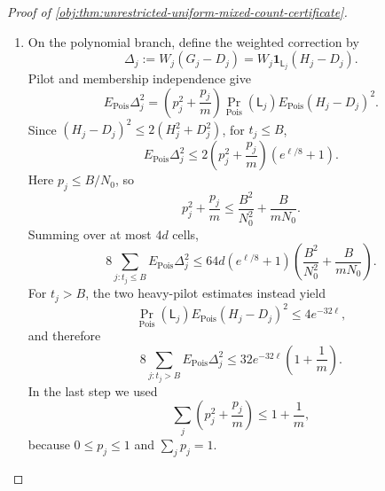 \documentclass[11pt]{article}
\begin{document}
\begin{proof}[Proof of \cref{obj:thm:unrestricted-uniform-mixed-count-certificate}]
\begin{enumerate}
Expanding the variance of the independent product \(W_jD_j\) gives
\[
\operatorname{Var}_{\mathrm{Pois}}(W_jD_j)
=p_j^2\operatorname{Var}_{\mathrm{Pois}}(D_j)
+\frac{p_j}{m}E_{\mathrm{Pois}}D_j^2.
\]
Using \(D_j^2\le1\) and \(N_0p_j\le t_j\),
\[
\frac{p_j^2}{1+t_j}\le\frac{p_j}{N_0},
\]
including \(p_j=0\). Summing over cells proves
\[
\sum_j\operatorname{Var}_{\mathrm{Pois}}(W_jD_j)
\le\frac4{N_0}+\frac1m.
\]

\item On the polynomial branch, define the weighted correction by
\[
\Delta_j:=W_j(G_j-D_j)
=W_j\mathbf1_{\mathsf L_j}(H_j-D_j).
\]
Pilot and membership independence give
\[
E_{\mathrm{Pois}}\Delta_j^2
=
\left(p_j^2+\frac{p_j}{m}\right)
\Pr_{\mathrm{Pois}}(\mathsf L_j)
E_{\mathrm{Pois}}(H_j-D_j)^2.
\]
Since \((H_j-D_j)^2\le2(H_j^2+D_j^2)\), for \(t_j\le B\),
\[
E_{\mathrm{Pois}}\Delta_j^2
\le2\left(p_j^2+\frac{p_j}{m}\right)(e^{\ell/8}+1).
\]
Here \(p_j\le B/N_0\), so
\[
p_j^2+\frac{p_j}{m}
\le\frac{B^2}{N_0^2}+\frac{B}{mN_0}.
\]
Summing over at most \(4d\) cells,
\[
8\sum_{j:t_j\le B}E_{\mathrm{Pois}}\Delta_j^2
\le
64d(e^{\ell/8}+1)
\left(\frac{B^2}{N_0^2}+\frac{B}{mN_0}\right).
\]
For \(t_j>B\), the two heavy-pilot estimates instead yield
\[
\Pr_{\mathrm{Pois}}(\mathsf L_j)
E_{\mathrm{Pois}}(H_j-D_j)^2
\le4e^{-32\ell},
\]
and therefore
\[
8\sum_{j:t_j>B}E_{\mathrm{Pois}}\Delta_j^2
\le32e^{-32\ell}\left(1+\frac1m\right).
\]
In the last step we used
\[
\sum_j\left(p_j^2+\frac{p_j}{m}\right)
\le1+\frac1m,
\]
because \(0\le p_j\le1\) and \(\sum_jp_j=1\).


\end{enumerate}
\end{proof}
\end{document}
